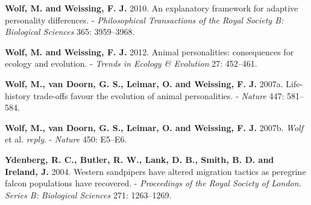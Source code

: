 \documentclass[]{scrartcl}
\begin{document}
\begin{multicols}{2}
\textbf{Wolf, M. and Weissing, F. J.} 2010. An explanatory framework for
adaptive personality differences. - \emph{Philosophical Transactions of
the Royal Society B: Biological Sciences} 365: 3959--3968.

\textbf{Wolf, M. and Weissing, F. J.} 2012. Animal personalities:
consequences for ecology and evolution. - \emph{Trends in Ecology \&
Evolution} 27: 452--461.

\textbf{Wolf, M., van Doorn, G. S., Leimar, O. and Weissing, F. J.}
2007a. Life-history trade-offs favour the evolution of animal
personalities. - \emph{Nature} 447: 581--584.

\textbf{Wolf, M., van Doorn, G. S., Leimar, O. and Weissing, F. J.}
2007b. \emph{Wolf} et al. \emph{reply}. - \emph{Nature} 450: E5--E6.

\textbf{Ydenberg, R. C., Butler, R. W., Lank, D. B., Smith, B. D. and
Ireland, J.} 2004. Western sandpipers have altered migration tactics as
peregrine falcon populations have recovered. - \emph{Proceedings of the
Royal Society of London. Series B: Biological Sciences} 271: 1263--1269.

\end{multicols}
\end{document}
